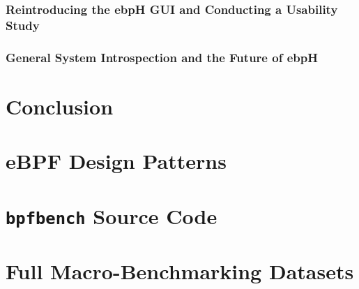 \documentclass[
  12pt]{findlay}
\begin{document}
\hypertarget{reintroducing-the-ebph-gui-and-conducting-a-usability-study}{%
\subsubsection{Reintroducing the ebpH GUI and Conducting a Usability
Study}\label{reintroducing-the-ebph-gui-and-conducting-a-usability-study}}

\label{gui_section}

\hypertarget{general-system-introspection-and-the-future-of-ebph}{%
\subsubsection{General System Introspection and the Future of
ebpH}\label{general-system-introspection-and-the-future-of-ebph}}

\label{general_introspection}

\hypertarget{conclusion}{%
\section{Conclusion}\label{conclusion}}

\clearpage
{}
\printbibliography
\clearpage

\appendix
\appendixpage

\hypertarget{ebpf-design-patterns}{%
\section{eBPF Design Patterns}\label{ebpf-design-patterns}}

\label{ebpf-design-patterns}


\FloatBarrier

\clearpage

\hypertarget{bpfbench-source-code}{%
\section{\texorpdfstring{\texttt{bpfbench} Source
Code}{bpfbench Source Code}}\label{bpfbench-source-code}}

\label{bpfbench}


\hypertarget{full-macro-benchmarking-datasets}{%
\section{Full Macro-Benchmarking
Datasets}\label{full-macro-benchmarking-datasets}}

\label{appendix_datasets}

\begingroup
\let\tablesize\scriptsize


\endgroup
\end{document}
